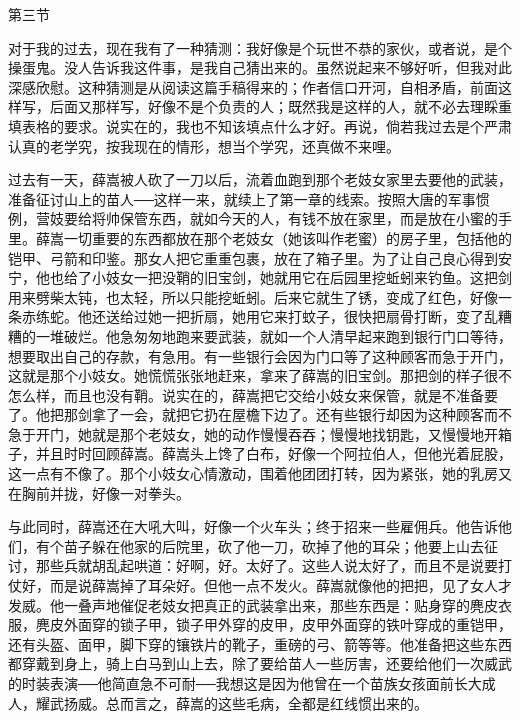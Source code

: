 第三节 

对于我的过去，现在我有了一种猜测：我好像是个玩世不恭的家伙，或者说，是个操蛋鬼。没人告诉我这件事，是我自己猜出来的。虽然说起来不够好听，但我对此深感欣慰。这种猜测是从阅读这篇手稿得来的；作者信口开河，自相矛盾，前面这样写，后面又那样写，好像不是个负责的人；既然我是这样的人，就不必去理睬重填表格的要求。说实在的，我也不知该填点什么才好。再说，倘若我过去是个严肃认真的老学究，按我现在的情形，想当个学究，还真做不来哩。 

过去有一天，薛嵩被人砍了一刀以后，流着血跑到那个老妓女家里去要他的武装，准备征讨山上的苗人──这样一来，就续上了第一章的线索。按照大唐的军事惯例，营妓要给将帅保管东西，就如今天的人，有钱不放在家里，而是放在小蜜的手里。薛嵩一切重要的东西都放在那个老妓女（她该叫作老蜜）的房子里，包括他的铠甲、弓箭和印鉴。那女人把它重重包裹，放在了箱子里。为了让自己良心得到安宁，他也给了小妓女一把没鞘的旧宝剑，她就用它在后园里挖蚯蚓来钓鱼。这把剑用来劈柴太钝，也太轻，所以只能挖蚯蚓。后来它就生了锈，变成了红色，好像一条赤练蛇。他还送给过她一把折扇，她用它来打蚊子，很快把扇骨打断，变了乱糟糟的一堆破烂。他急匆匆地跑来要武装，就如一个人清早起来跑到银行门口等待，想要取出自己的存款，有急用。有一些银行会因为门口等了这种顾客而急于开门，这就是那个小妓女。她慌慌张张地赶来，拿来了薛嵩的旧宝剑。那把剑的样子很不怎么样，而且也没有鞘。说实在的，薛嵩把它交给小妓女来保管，就是不准备要了。他把那剑拿了一会，就把它扔在屋檐下边了。还有些银行却因为这种顾客而不急于开门，她就是那个老妓女，她的动作慢慢吞吞；慢慢地找钥匙，又慢慢地开箱子，并且时时回顾薛嵩。薛嵩头上馋了白布，好像一个阿拉伯人，但他光着屁股，这一点有不像了。那个小妓女心情激动，围着他团团打转，因为紧张，她的乳房又在胸前并拢，好像一对拳头。 

与此同时，薛嵩还在大吼大叫，好像一个火车头；终于招来一些雇佣兵。他告诉他们，有个苗子躲在他家的后院里，砍了他一刀，砍掉了他的耳朵；他要上山去征讨，那些兵就胡乱起哄道：好啊，好。太好了。这些人说太好了，而且不是说要打仗好，而是说薛嵩掉了耳朵好。但他一点不发火。薛嵩就像他的把把，见了女人才发威。他一叠声地催促老妓女把真正的武装拿出来，那些东西是：贴身穿的麂皮衣服，麂皮外面穿的锁子甲，锁子甲外穿的皮甲，皮甲外面穿的铁叶穿成的重铠甲，还有头盔、面甲，脚下穿的镶铁片的靴子，重磅的弓、箭等等。他准备把这些东西都穿戴到身上，骑上白马到山上去，除了要给苗人一些厉害，还要给他们一次威武的时装表演──他简直急不可耐──我想这是因为他曾在一个苗族女孩面前长大成人，耀武扬威。总而言之，薛嵩的这些毛病，全都是红线惯出来的。 

